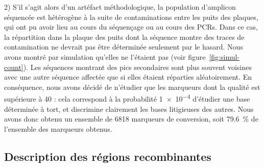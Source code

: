 2) S'il s'agit alors d'un artéfact méthodologique, la population d'amplicon
séquencée est hétérogène à la suite de contaminations entre les puits des
plaques, qui ont pu avoir lieu au cours du séquençage ou au cours des PCRs. Dans
ce cas, la répartition dans la plaque des puits dont la séquence montre des
traces de contamination ne devrait pas être déterminée seulement par le hasard.
Nous avons montré par simulation qu'elles ne l'étaient pas (voir
figure~\ref{fig:simul-count}). Les séquences montrant des pics secondaires sont
plus souvent voisines avec une autre séquence affectée que si elles étaient
réparties aléatoirement. En conséquence, nous avons décidé de n'étudier que les
marqueurs dont la qualité est supérieure à 40 : cela correspond à la probabilité
\num{1e-4} d'étudier une base déterminée à tort, et discrimine clairement les
bases litigieuses des autres. Nous avons donc obtenu un ensemble de \num{6818}
marqueurs de conversion, soit \SI{79.6}{\percent} de l'ensemble des marqueurs
obtenus.


\subsection{Description des régions recombinantes}
\label{subsec:result-descript}


